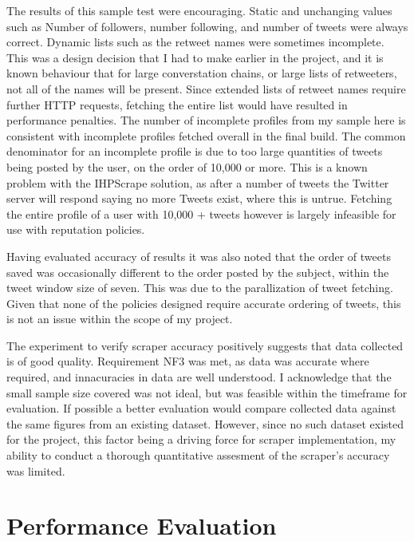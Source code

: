 The results of this sample test were encouraging. Static and unchanging values such as Number of followers, number following, and number of tweets were always correct. Dynamic lists such as the retweet names were sometimes incomplete. This was a design decision that I had to make earlier in the project, and it is known behaviour that for large converstation chains, or large lists of retweeters, not all of the names will be present. Since extended lists of retweet names require further HTTP requests, fetching the entire list would have resulted in performance penalties. The number of incomplete profiles from my sample here is consistent with incomplete profiles fetched overall in the final build. The common denominator for an incomplete profile is due to too large quantities of tweets being posted by the user, on the order of 10,000 or more. This is a known problem with the IHPScrape solution, as after a number of tweets the Twitter server will respond saying no more Tweets exist, where this is untrue. Fetching the entire profile of a user with 10,000 + tweets however is largely infeasible for use with reputation policies.

Having evaluated accuracy of results it was also noted that the order of tweets saved was occasionally different to the order posted by the subject, within the tweet window size of seven. This was due to the parallization of tweet fetching. Given that none of the policies designed require accurate ordering of tweets, this is not an issue within the scope of my project. 

The experiment to verify scraper accuracy positively suggests that data collected is of good quality. Requirement NF3 was met, as data was accurate where required, and innacuracies in data are well understood. I acknowledge that the small sample size covered was not ideal, but was feasible within the timeframe for evaluation. If possible a better evaluation would compare collected data against the same figures from an existing dataset. However, since no such dataset existed for the project, this factor being a driving force for scraper implementation, my ability to conduct a thorough quantitative assesment of the scraper's accuracy was limited.

\section{Performance Evaluation}


